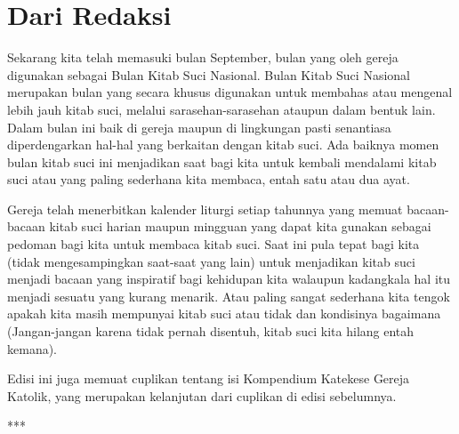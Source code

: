 \newpage

\section*{\center Dari Redaksi}


Sekarang kita telah memasuki bulan September, bulan yang oleh gereja digunakan sebagai Bulan Kitab Suci Nasional. Bulan Kitab Suci Nasional merupakan bulan yang secara khusus digunakan untuk membahas atau mengenal lebih jauh kitab suci, melalui sarasehan-sarasehan ataupun dalam bentuk lain. Dalam bulan ini baik di gereja maupun di lingkungan pasti senantiasa diperdengarkan hal-hal yang berkaitan dengan kitab suci. Ada baiknya momen bulan kitab suci ini menjadikan saat bagi kita untuk kembali mendalami kitab suci atau yang paling sederhana kita membaca, entah satu atau dua ayat. 

Gereja telah menerbitkan kalender liturgi setiap tahunnya yang memuat bacaan-bacaan kitab suci harian maupun mingguan yang dapat kita gunakan sebagai pedoman bagi kita untuk membaca kitab suci. Saat ini pula tepat bagi kita (tidak mengesampingkan saat-saat yang lain) untuk menjadikan kitab suci menjadi bacaan yang inspiratif bagi kehidupan kita walaupun kadangkala hal itu menjadi sesuatu yang kurang menarik. Atau paling sangat sederhana kita tengok apakah kita masih mempunyai kitab suci atau tidak dan kondisinya bagaimana (Jangan-jangan karena tidak pernah disentuh, kitab suci kita hilang entah kemana).

Edisi ini juga memuat cuplikan tentang isi Kompendium Katekese Gereja Katolik, yang merupakan kelanjutan dari cuplikan di edisi sebelumnya.

\begin{center}***\end{center} 

\vspace*{1.3cm}

